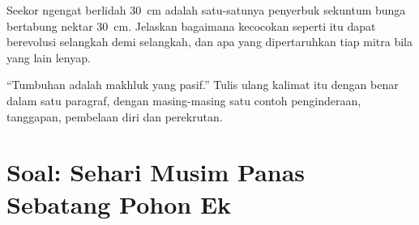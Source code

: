 \begin{exercise}[$\star\star\star$]\label{exo:g12:plant-rooted-life:14}
Seekor ngengat berlidah \qty{30}{cm} adalah satu-satunya penyerbuk
sekuntum bunga bertabung nektar \qty{30}{cm}. Jelaskan bagaimana
kecocokan seperti itu dapat berevolusi selangkah demi selangkah, dan
apa yang dipertaruhkan tiap mitra bila yang lain lenyap.
\end{exercise}

\begin{exercise}[$\star\star\star$]\label{exo:g12:plant-rooted-life:15}
``Tumbuhan adalah makhluk yang pasif.'' Tulis ulang kalimat itu dengan
benar dalam satu paragraf, dengan masing-masing satu contoh
penginderaan, tanggapan, pembelaan diri dan perekrutan.
\end{exercise}

\section{Soal: Sehari Musim Panas Sebatang Pohon Ek}

